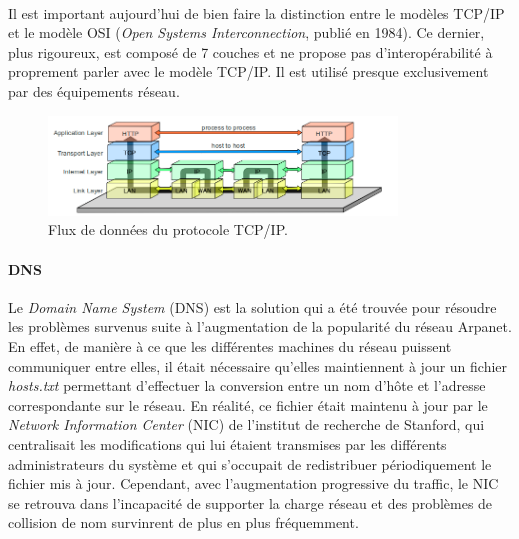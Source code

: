 \paragraph{} Il est important aujourd'hui de bien faire la distinction entre le modèles TCP/IP et le modèle OSI 
(\emph{Open Systems Interconnection}, publié en 1984). Ce dernier, plus rigoureux, est composé de 7 couches et ne
propose pas d'interopérabilité à proprement parler avec le modèle TCP/IP. Il est utilisé presque exclusivement par des
équipements réseau.

\begin{figure}[ht]
    \centering
    \includegraphics[width=350px]{chapters/01/images/tcpip_dataflow.png}
    \caption{\label{tcpip_dataflow}Flux de données du protocole TCP/IP.}
\end{figure}

\paragraph{DNS} Le \emph{Domain Name System} (DNS) est la solution qui a été trouvée pour résoudre les problèmes survenus
suite à l'augmentation de la popularité du réseau Arpanet. En effet, de manière à ce que les différentes machines du 
réseau puissent communiquer entre elles, il était nécessaire qu'elles maintiennent à jour un fichier \emph{hosts.txt}
permettant d'effectuer la conversion entre un nom d'hôte et l'adresse correspondante sur le réseau. En réalité, ce fichier
était maintenu à jour par le \emph{Network Information Center} (NIC) de l'institut de recherche de Stanford, qui centralisait
les modifications qui lui étaient transmises par les différents administrateurs du système et qui s'occupait de redistribuer
périodiquement le fichier mis à jour. Cependant, avec l'augmentation progressive du traffic, le NIC se retrouva dans
l'incapacité de supporter la charge réseau et des problèmes de collision de nom survinrent de plus en plus fréquemment.

